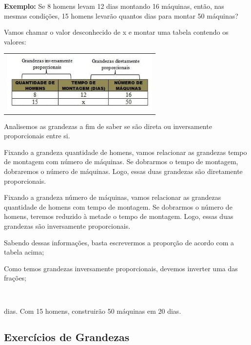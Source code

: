 \begin{multicols*}{2}
\textbf{Exemplo:} Se 8 homens levam 12 dias montando 16 máquinas, então, nas mesmas condições, 15 homens levarão quantos dias para montar 50 máquinas?

		Vamos chamar o valor desconhecido de x e montar uma tabela contendo os valores:

		\begin{tabular}{@{}c@{}}
		  \includegraphics[height=30mm]{assets/R3composta.jpg}
		\end{tabular}

Analisemos as grandezas a fim de saber se são direta ou inversamente proporcionais entre si.

Fixando a grandeza quantidade de homens, vamos relacionar as grandezas tempo de montagem com número de máquinas. Se dobrarmos o tempo de montagem, dobraremos o número de máquinas. Logo, essas duas grandezas são diretamente proporcionais.

Fixando a grandeza número de máquinas, vamos relacionar as grandezas quantidade de homens com tempo de montagem. Se dobrarmos o número de homens, teremos reduzido à metade o tempo de montagem. Logo, essas duas grandezas são inversamente proporcionais.

Sabendo dessas informações, basta escrevermos a proporção de acordo com a tabela acima;

Como temos grandezas inversamente proporcionais, devemos inverter uma das frações;

\\



 dias. Com 15 homens, construirão 50 máquinas em 20 dias.

\subsection{Exercícios de Grandezas}


\end{multicols*}
